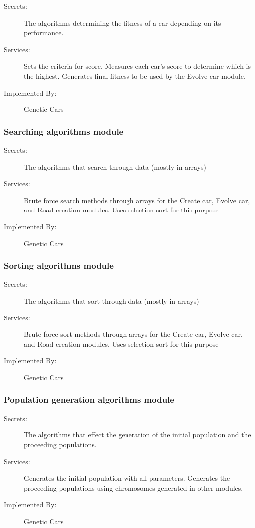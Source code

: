 \documentclass[12pt, titlepage]{article}
\begin{document}
\begin{description}
\item[Secrets:] The algorithms determining the fitness of  a car depending on 
its performance.
\item[Services:] Sets the criteria for score. Measures each car's score to 
determine which is the highest. Generates final fitness to be used by the Evolve 
car module.
\item[Implemented By:] Genetic Cars
\end{description}

\subsubsection{Searching algorithms module}

\begin{description}
\item[Secrets:] The algorithms that search through data (mostly in arrays)
\item[Services:] Brute force search methods through arrays for the Create car, 
Evolve car, and Road creation modules. Uses selection sort for this purpose
\item[Implemented By:] Genetic Cars
\end{description}

\subsubsection{Sorting algorithms module}

\begin{description}
\item[Secrets:] The algorithms that sort through data (mostly in arrays)
\item[Services:] Brute force sort methods through arrays for the Create car, 
Evolve car, and Road creation modules. Uses selection sort for this purpose
\item[Implemented By:] Genetic Cars
\end{description}

\subsubsection{Population generation algorithms module}

\begin{description}
\item[Secrets:] The algorithms that effect the generation of the initial 
population and the proceeding populations. 
\item[Services:] Generates the initial population with all parameters. Generates 
the proceeding populations using chromosomes generated in other modules. 
\item[Implemented By:] Genetic Cars
\end{description}
\end{document}
